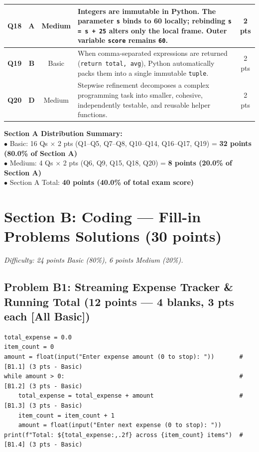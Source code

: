 \documentclass[11pt,a4paper]{article}
\begin{document}
\begin{center}
\begin{tabularx}{\textwidth}{|c|c|c|X|c|}
\hline
\textbf{Q18} & \textbf{A} & Medium & Integers are immutable in Python. The parameter \texttt{s} binds to 60 locally; rebinding \texttt{s = s + 25} alters only the local frame. Outer variable \texttt{score} remains \texttt{60}. & 2 pts \\
\hline
\textbf{Q19} & \textbf{B} & Basic & When comma-separated expressions are returned (\texttt{return total, avg}), Python automatically packs them into a single immutable \texttt{tuple}. & 2 pts \\
\hline
\textbf{Q20} & \textbf{D} & Medium & Stepwise refinement decomposes a complex programming task into smaller, cohesive, independently testable, and reusable helper functions. & 2 pts \\
\hline
\end{tabularx}
\end{center}

\vspace{0.6mm}
\begin{tcolorbox}[colback=boxbg, colframe=primaryblue!45, arc=1.2mm, left=2.0mm, right=2.0mm, top=0.8mm, bottom=0.8mm]
\small
\textbf{Section A Distribution Summary:}\\
$\bullet$ Basic: 16 Qs $\times$ 2 pts (Q1--Q5, Q7--Q8, Q10--Q14, Q16--Q17, Q19) = \textbf{32 points (80.0\% of Section A)}\\
$\bullet$ Medium: 4 Qs $\times$ 2 pts (Q6, Q9, Q15, Q18, Q20) = \textbf{8 points (20.0\% of Section A)}\\
$\bullet$ Section A Total: \textbf{40 points (40.0\% of total exam score)}
\end{tcolorbox}

\vspace{-1.0mm}
\section*{Section B: Coding --- Fill-in Problems Solutions (30 points)}
\textit{Difficulty: 24 points Basic (80\%), 6 points Medium (20\%).}

\subsection*{Problem B1: Streaming Expense Tracker \& Running Total (12 points --- 4 blanks, 3 pts each [All Basic])}

\begin{lstlisting}
total_expense = 0.0
item_count = 0
amount = float(input("Enter expense amount (0 to stop): "))       # [B1.1] (3 pts - Basic)
while amount > 0:                                                 # [B1.2] (3 pts - Basic)
    total_expense = total_expense + amount                        # [B1.3] (3 pts - Basic)
    item_count = item_count + 1
    amount = float(input("Enter next expense (0 to stop): "))
print(f"Total: ${total_expense:,.2f} across {item_count} items")  # [B1.4] (3 pts - Basic)
\end{lstlisting}
\end{document}
